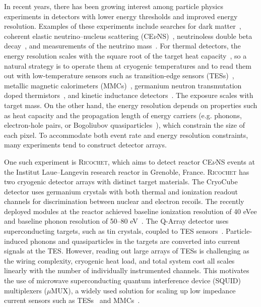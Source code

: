 \documentclass[10pt]{iopart}
\newcommand{\ricochet}{\textsc{Ricochet}\xspace}
\newcommand{\cevns}{CE$\nu$NS\xspace}
\newcommand{\uMUX}{$\mu$MUX\xspace}
\begin{document}
In recent years, there has been growing interest among particle physics experiments in detectors with lower energy thresholds and improved energy resolution. Examples of these experiments include searches for dark matter~\cite{armengaud_constraints_2016, agnese_first_2018, angloher_results_2023, alloni_new_2025}, coherent elastic neutrino--nucleus scattering (\cevns)~\cite{angloher_exploring_2019, augier_ricochet_2023}, neutrinoless double beta decay~\cite{legend_design_2021, the_cuore_collaboration_search_2022, agrawal_development_2025, cupidcollaboration_cupid_2025}, and measurements of the neutrino mass~\cite{gastaldo_electron_2014, faverzani_holmes_2016}. For thermal detectors, the energy resolution scales with the square root of the target heat capacity~\cite{ascheron_thermal_2005}, so a natural strategy is to operate them at cryogenic temperatures and to read them out with low-temperature sensors such as transition-edge sensors (TESs)~\cite{irwin_application_1995, ascheron_transition-edge_2005}, metallic magnetic calorimeters (MMCs)~\cite{enss_metallic_2000, kempf_physics_2018}, germanium neutron transmutation doped thermistors~\cite{haller_advanced_1994}, and kinetic inductance detectors~\cite{day_broadband_2003, zmuidzinas_superconducting_2012}. The exposure scales with target mass. On the other hand, the energy resolution depends on properties such as heat capacity and the propagation length of energy carriers (e.g. phonons, electron-hole pairs, or Bogoliubov quasiparticles~\cite{catelani_using_2022}), which constrain the size of each pixel. To accommodate both event rate and energy resolution constraints, many experiments tend to construct detector arrays.

One such experiment is \ricochet, which aims to detect reactor \cevns events at the Institut Laue--Langevin research reactor in Grenoble, France. \ricochet has two cryogenic detector arrays with distinct target materials. The CryoCube detector uses germanium crystals with both thermal and ionization readout channels for discrimination between nuclear and electron recoils. The recently deployed modules at the reactor achieved baseline ionization resolution of 40 eVee and baseline phonon resolution of 50--80 eV~\cite{armatol_characterization_2025}. The Q-Array detector uses superconducting targets, such as tin crystals, coupled to TES sensors~\cite{augier_results_2023}. Particle-induced phonons and quasiparticles in the targets are converted into current signals at the TES. However, reading out large arrays of TESs is challenging as the wiring complexity, cryogenic heat load, and total system cost all scales linearly with the number of individually instrumented channels. This motivates the use of microwave superconducting quantum interference device (SQUID) multiplexers (\uMUX), a widely used solution for scaling up low impedance current sensors such as TESs~\cite{bennett_integration_2015,mates_simultaneous_2017,becker_working_2019,szypryt_tabletop_2023,satterthwaite_simons_2024} and MMCs~\cite{kempf_design_2017, neidig_full-scale_2025}.
\end{document}
